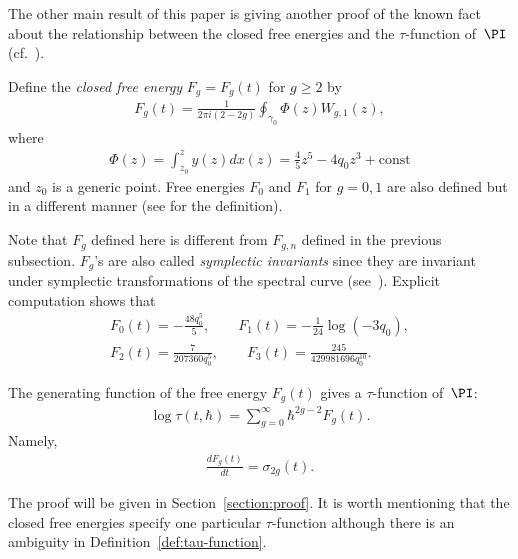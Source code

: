 The other main result of this paper is giving
another proof of the known fact
about the relationship between the closed free energies
and the $\tau$-function of~$\PI$
(cf.~\cite{DGZJ,EO07}).


\begin{Def}
Def\/ine the {\em closed free energy}
$F_{g} = F_{g}(t)$ for $g \ge 2$ by
\begin{gather*}
F_{g}(t) = \frac{1}{2\pi i (2-2g)}
\oint_{\gamma_{0}} \Phi(z) W_{g,1}(z),
\end{gather*}
where
\begin{gather*}
\Phi(z) = \int^{z}_{z_{0}} y(z)dx(z)
  = \frac{4}{5}z^{5} - 4q_{0} z^{3} +
\text{const}
\end{gather*}
and $z_{0}$ is a generic point.
Free energies $F_{0}$ and $F_{1}$ for $g = 0, 1$
are also def\/ined but in a dif\/ferent manner
(see \cite[Sections~4.2.2 and~4.2.3]{EO07} for the def\/inition).
\end{Def}

Note that $F_g$ def\/ined here is dif\/ferent from $F_{g,n}$
def\/ined in the previous subsection.
$F_g$'s are also called {\it symplectic invariants}
since they are invariant under symplectic transformations
of the spectral curve (see~\cite{EO07}).
Explicit computation shows that
\begin{gather*}
F_{0}(t)   =   -\frac{48 q_{0}^{5}}{5},
\qquad
F_{1}(t)   =   -\frac{1}{24} \log(-3q_{0}), \\
F_{2}(t)   =   \frac{7}{207360 q_{0}^{5}},
\qquad
F_{3}(t)   =   \frac{245}{429981696 q_{0}^{10}}.
\end{gather*}

\begin{thm}  \label{conj:1}
The generating function of the free energy $F_{g}(t)$
gives a $\tau$-function of~$\PI$:
\begin{gather*}
\log\tau(t,\hbar) = \sum_{g=0}^{\infty} \hbar^{2g-2} F_{g}(t).
\end{gather*}
Namely,
\begin{gather} \label{eq:tau-conjecture-g}
\frac{dF_{g}(t)}{dt} = \sigma_{2g}(t).
\end{gather}
\end{thm}

The proof will be given in Section~\ref{section:proof}.
It is worth mentioning that the closed free energies specify one
particular $\tau$-function although there is an ambiguity
in Def\/inition~\ref{def:tau-function}.

